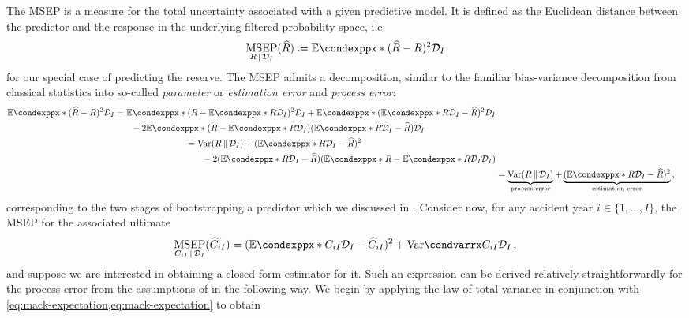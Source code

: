 \documentclass[a4paper]{book}
\begin{document}
The MSEP is a measure for the total uncertainty associated with a given predictive model. It is defined as the Euclidean distance between the predictor and the response in the underlying filtered probability space, i.e.\
\begin{equation}
    \underset{R \, \vert \, \mathcal{D}_I}{\mathrm{MSEP}}(\widehat{R}) \coloneqq \condexpp*{(\widehat{R} - R)^2}{\mathcal{D}_I}
\end{equation}
for our special case of predicting the reserve. The MSEP admits a decomposition, similar to the familiar bias-variance decomposition from classical statistics into so-called \emph{parameter} or \emph{estimation error} and \emph{process error}:
\begin{align}
    \begin{split}
        \condexpp*{(\widehat{R} - R)^2}{\mathcal{D}_I} &= \condexpp*{(R - \condexpp*{R}{\mathcal{D}_I})^2}{\mathcal{D}_I} + \condexpp*{(\condexpp*{R}{\mathcal{D}_I} - \widehat{R})^2}{\mathcal{D}_I} \\ &\phantom{{}=1} -2\condexpp*{(R - \condexpp*{R}{\mathcal{D}_I})(\condexpp*{R}{\mathcal{D}_I} - \widehat{R})}{\mathcal{D}_I}
    \end{split} \\
    \begin{split}
    &= \mathrm{Var}(R \, \Vert \, \mathcal{D}_I) + (\condexpp*{R}{\mathcal{D}_I} - \widehat{R})^2 \\
    &\phantom{{}=1} -2(\condexpp*{R}{\mathcal{D}_I} - \widehat{R})(\condexpp*{R - \condexpp*{R}{\mathcal{D}_I}}{\mathcal{D}_I})
    \end{split} \\
    &= \underbrace{\mathrm{Var}(R \, \Vert \, \mathcal{D}_I)}_\text{process error} + \underbrace{(\condexpp*{R}{\mathcal{D}_I} - \widehat{R})^2}_\text{estimation error} \,,
\end{align}
corresponding to the two stages of bootstrapping a predictor which we discussed in . Consider now, for any accident year $i \in \{ 1, \dots, I \}$, the MSEP for the associated ultimate
\begin{equation} \label{eq:msep}
    \underset{C_{iI} \, \vert \, \mathcal{D}_I}{\mathrm{MSEP}}(\widehat{C}_{iI}) = (\condexpp*{C_{iI}}{\mathcal{D}_I} - \widehat{C}_{iI})^2 + \condvarr{C_{iI}}{\mathcal{D}_I} \,,
\end{equation}
and suppose we are interested in obtaining a closed-form estimator for it. Such an expression can be derived relatively straightforwardly for the process error from the assumptions of  in the following way. We begin by applying the law of total variance in conjunction with \cref{eq:mack-expectation,eq:mack-expectation} to obtain
\end{document}
